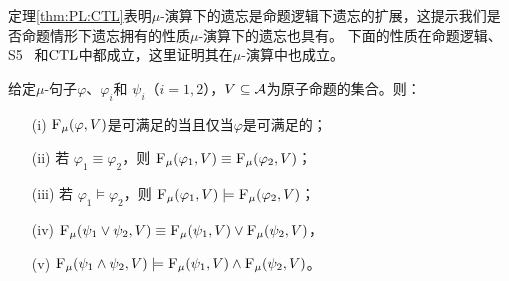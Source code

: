 定理\ref{thm:PL:CTL}表明$\mu$-演算下的遗忘是命题逻辑下遗忘的扩展，这提示我们是否命题情形下遗忘拥有的性质$\mu$-演算下的遗忘也具有。
下面的性质在命题逻辑、S5~\cite{Yan:AIJ:2009} 和$\textrm{CTL}$中都成立，这里证明其在$\mu$-演算中也成立。
\begin{proposition}
	\label{chapter06:pro:ctl:forget:1}
	给定$\mu$-句子$\varphi$、$\varphi_i$和 $\psi_i$（$i=1,2$），$V\subseteq {\cal A}$为原子命题的集合。则：
	\begin{itemize}
		\item[(i)] ${\textsc{F}_{\textsc{$\mu$}}}(\varphi, V)$是可满足的当且仅当$\varphi$是可满足的；
		\item[(ii)] 若 $\varphi_1 \equiv \varphi_2$，则 ${\textsc{F}_{\textsc{$\mu$}}}(\varphi_1, V) \equiv {\textsc{F}_{\textsc{$\mu$}}}(\varphi_2, V)$；
		\item[(iii)] 若 $\varphi_1 \models \varphi_2$，则 ${\textsc{F}_{\textsc{$\mu$}}}(\varphi_1, V) \models {\textsc{F}_{\textsc{$\mu$}}}(\varphi_2, V)$；
		\item[(iv)] ${\textsc{F}_{\textsc{$\mu$}}}(\psi_1 \vee \psi_2, V) \equiv {\textsc{F}_{\textsc{$\mu$}}}(\psi_1, V) \vee {\textsc{F}_{\textsc{$\mu$}}}(\psi_2, V)$，
		\item[(v)] ${\textsc{F}_{\textsc{$\mu$}}}(\psi_1 \wedge \psi_2, V) \models {\textsc{F}_{\textsc{$\mu$}}}(\psi_1, V) \wedge {\textsc{F}_{\textsc{$\mu$}}}(\psi_2, V)$。
	\end{itemize}
\end{proposition}
